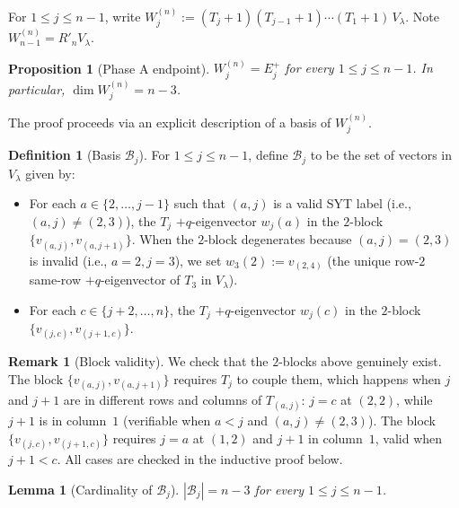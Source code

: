 \documentclass[11pt]{article}
\newtheorem{lemma}[theorem]{Lemma}
\newtheorem{proposition}[theorem]{Proposition}
\theoremstyle{definition}
\newtheorem{definition}[theorem]{Definition}
\newtheorem{remark}[theorem]{Remark}
\begin{document}
For $1 \le j \le n-1$, write
$W_j^{(n)} := (T_j{+}1)(T_{j-1}{+}1)\cdots(T_1{+}1)\,V_\lambda$.
Note $W_{n-1}^{(n)} = R'_n V_\lambda$.

\begin{proposition}[Phase A endpoint]\label{prop:phaseA}
$W_j^{(n)} = E_j^+$ for every $1 \le j \le n-1$.  In particular,
$\dim W_j^{(n)} = n-3$.
\end{proposition}

The proof proceeds via an explicit description of a basis of
$W_j^{(n)}$.

\begin{definition}[Basis $\mathcal{B}_j$]\label{def:Bj}
For $1 \le j \le n-1$, define $\mathcal{B}_j$ to be the set of vectors
in $V_\lambda$ given by:
\begin{itemize}[leftmargin=2em,topsep=0.3em,itemsep=0.2em]
\item For each $a \in \{2,\ldots,j-1\}$ such that $(a,j)$ is a valid
SYT label (i.e., $(a,j) \ne (2,3)$), the $T_j$ $+q$-eigenvector
$w_j(a)$ in the $2$-block $\{v_{(a,j)}, v_{(a,j+1)}\}$.  When the
$2$-block degenerates because $(a,j)=(2,3)$ is invalid (i.e., $a=2,
j=3$), we set $w_3(2) := v_{(2,4)}$ (the unique row-$2$ same-row
$+q$-eigenvector of $T_3$ in $V_\lambda$).
\item For each $c \in \{j+2,\ldots,n\}$, the $T_j$ $+q$-eigenvector
$w_j(c)$ in the $2$-block $\{v_{(j,c)}, v_{(j+1,c)}\}$.
\end{itemize}
\end{definition}

\begin{remark}[Block validity]\label{rem:blocks}
We check that the $2$-blocks above genuinely exist.  The block
$\{v_{(a,j)}, v_{(a,j+1)}\}$ requires $T_j$ to couple them, which
happens when $j$ and $j{+}1$ are in different rows and columns of
$T_{(a,j)}$: $j = c$ at $(2,2)$, while $j+1$ is in column~$1$
(verifiable when $a < j$ and $(a,j) \ne (2,3)$).  The block
$\{v_{(j,c)}, v_{(j+1,c)}\}$ requires $j = a$ at $(1,2)$ and $j+1$ in
column~$1$, valid when $j+1 < c$.  All cases are checked in the
inductive proof below.
\end{remark}

\begin{lemma}[Cardinality of $\mathcal{B}_j$]\label{lem:Bj-size}
$|\mathcal{B}_j| = n - 3$ for every $1 \le j \le n - 1$.
\end{lemma}
\end{document}
